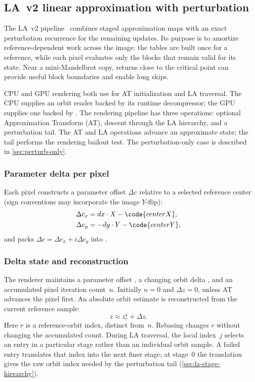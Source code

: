 \subsection{LA~v2 linear approximation with perturbation}
\label{sec:la-v2-perturb}

The LA~v2 pipeline~\cite{Imagina} combines staged approximation maps with
an exact perturbation recurrence for the remaining updates. Its purpose
is to amortize reference-dependent work across the image: the tables are
built once for a reference, while each pixel evaluates only the blocks
that remain valid for its state. Near a mini-Mandelbrot copy, returns
close to the critical point can provide useful block boundaries and
enable long skips.

CPU and GPU rendering both use
 for AT initialization
and LA traversal. The CPU supplies an orbit reader backed by its
runtime decompressor; the GPU supplies one backed by
. The rendering pipeline has three
operations: optional Approximation Transform (AT), descent through
the LA hierarchy, and a perturbation tail. The AT and LA operations
advance an approximate state; the tail performs the rendering bailout
test. The perturbation-only case is described in \cref{sec:perturb-only}.

\subsubsection{Parameter delta per pixel}
Each pixel constructs a parameter offset \(\Delta c\) relative to a selected
reference center (sign conventions may incorporate the image \(Y\)-flip):
\begin{align}
\Delta c_x &= dx\cdot X - \code{centerX}, \\
\Delta c_y &= -dy\cdot Y - \code{centerY},
\end{align}
and packs \(\Delta c=\Delta c_x+i\Delta c_y\) into .

\subsubsection{Delta state and reconstruction}
The renderer maintains a parameter offset , a changing
orbit delta , and an accumulated pixel iteration
count~$n$. Initially $n=0$ and $\Delta z=0$, unless AT advances the
pixel first. An absolute orbit estimate is reconstructed from the
current reference sample:
\[
z \approx z_r^\star + \Delta z.
\]
Here $r$ is a reference-orbit index, distinct from~$n$. Rebasing changes
$r$ without changing the accumulated count. During LA traversal, the
local index~$j$ selects an entry in a particular stage rather than an
individual orbit sample. A failed entry translates that index into the
next finer stage; at stage~0 the translation gives the raw orbit index
needed by the perturbation tail (\cref{sec:la-stage-hierarchy}).

